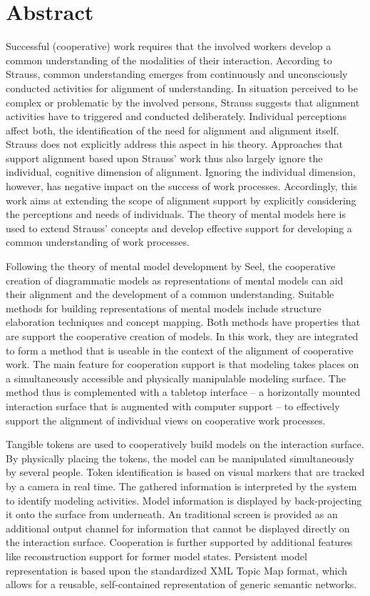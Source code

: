 \section*{Abstract}
Successful (cooperative) work requires that the involved workers develop a common understanding of the modalities of their interaction. According to Strauss, common understanding emerges from continuously and unconsciously conducted activities for alignment of understanding. In situation perceived to be complex or problematic by the involved persons, Strauss suggests that alignment activities have to triggered and conducted deliberately. Individual perceptions affect both, the identification of the need for alignment and alignment itself. Strauss does not explicitly address this aspect in his theory. Approaches that support alignment based upon Strauss' work thus also largely ignore the individual, cognitive dimension of alignment. Ignoring the individual dimension, however, has negative impact on the success of work processes. Accordingly, this work aims at extending the scope of alignment support by explicitly considering the perceptions and needs of individuals. The theory of mental models here is used to extend Strauss' concepts and develop effective support for developing a common understanding of work processes.

Following the theory of mental model development by Seel, the cooperative creation of diagrammatic models as representations of mental models can aid their alignment and the development of a common understanding. Suitable methods for building representations of mental models include structure elaboration techniques and concept mapping. Both methods have properties that are support the cooperative creation of models. In this work, they are integrated to form a method that is useable in the context of the alignment of cooperative work. The main feature for cooperation support is that modeling takes places on a simultaneously accessible and physically manipulable modeling surface. The method thus is complemented with a tabletop interface -- a horizontally mounted interaction surface that is augmented with computer support -- to effectively support the alignment of individual views on cooperative work processes.

Tangible tokens are used to cooperatively build models on the interaction surface. By physically placing the tokens, the model can be manipulated simultaneously by several people. Token identification is based on visual markers that are tracked by a camera in real time. The gathered information is interpreted by the system to identify modeling activities. Model information is displayed by back-projecting it onto the surface from underneath. An traditional screen is provided as an additional output channel for information  that cannot be displayed directly on the interaction surface. Cooperation is further supported by additional features like reconstruction support for former model states. Persistent model representation is based upon the standardized XML Topic Map format, which allows for a reusable, self-contained representation of generic semantic networks.

